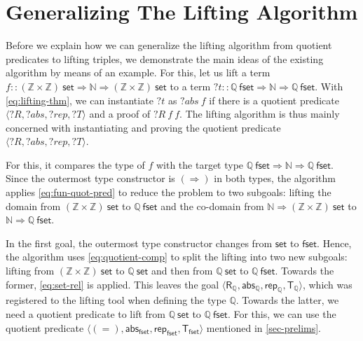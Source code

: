 \documentclass{article}
\newcommand{\kevin}[1]{\textcolor{violet}{\textbf{Kevin}: #1}}
\newcommand{\juli}[1]{\textcolor{orange}{\textbf{Juli}: #1}}
\theoremstyle{definition}
\newcommand{\id}{\mathsf{id}}
\newcommand{\nat}{\mathbb{N}}
\newcommand{\inte}{\mathbb{Z}}
\newcommand{\rat}{\mathbb{Q}}
\newcommand{\abs}{\mathsf{abs}}
\newcommand{\rep}{\mathsf{rep}}
\begin{document}
\section{Generalizing The Lifting Algorithm}\label{sec:lift-alg}
Before we explain how we can generalize the lifting algorithm from quotient predicates to lifting triples,
we demonstrate the main ideas of the existing algorithm by means of an example.
For this, let us lift a term \(f :: (\inte \times \inte)\ \mathsf{set} \Rightarrow \nat \Rightarrow (\inte \times \inte)\ \mathsf{set}\) to a term \(?t :: \rat\ \mathsf{fset} \Rightarrow \nat \Rightarrow \rat\ \mathsf{fset}\).
With \cref{eq:lifting-thm},
we can instantiate \(?t\) as \(?abs\ f\) if there is a quotient predicate \(\langle ?R, ?abs, ?rep, ?T \rangle\) and a proof of \(?R\ f\ f\).
The lifting algorithm is thus mainly concerned with instantiating and proving the quotient predicate \(\langle ?R, ?abs, ?rep, ?T \rangle\).

For this, it compares the type of \(f\) with the target type \(\rat\ \mathsf{fset} \Rightarrow \nat \Rightarrow \rat\ \mathsf{fset}\).
Since the outermost type constructor is \((\Rightarrow)\) in both types,
the algorithm applies \cref{eq:fun-quot-pred} to reduce the problem to two subgoals:
lifting the domain from \((\inte \times \inte)\ \mathsf{set}\) to \(\rat\ \mathsf{fset}\)
and the co-domain from \(\nat \Rightarrow (\inte \times \inte)\ \mathsf{set}\) to \(\nat \Rightarrow \rat\ \mathsf{fset}\).

In the first goal, the outermost type constructor changes from \(\mathsf{set}\) to \(\mathsf{fset}\).
Hence, the algorithm uses \cref{eq:quotient-comp} to split the lifting
into two new subgoals:
lifting from \((\inte \times \inte)\ \mathsf{set}\) to \(\rat\ \mathsf{set}\) and then from \(\rat\ \mathsf{set}\) to \(\rat\ \mathsf{fset}\).
Towards the former, \cref{eq:set-rel} is applied.
This leaves the goal \(\langle \mathsf{R_\rat}, \abs_\rat, \rep_\rat, \mathsf{T_\rat} \rangle\), which was registered to the lifting tool when defining the type \(\rat\).
Towards the latter, we need a quotient predicate to lift from \(\rat\ \mathsf{set}\) to \(\rat\ \mathsf{fset}\). For this, we can use the quotient predicate \(\langle (=), \abs_\mathsf{fset}, \rep_\mathsf{fset}, \mathsf{T_{fset}} \rangle\) mentioned in \cref{sec-prelims}.
\end{document}
